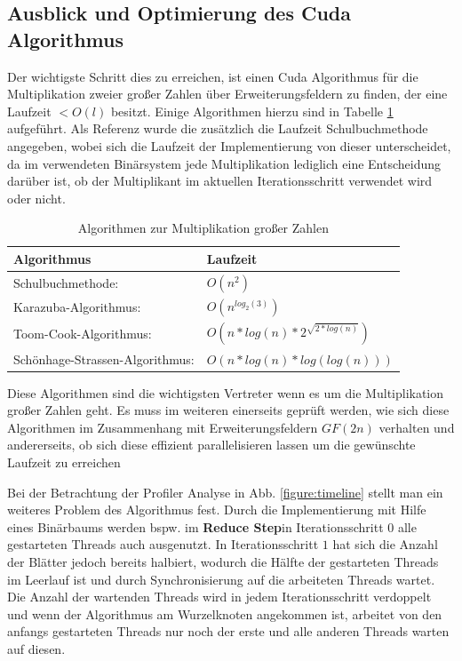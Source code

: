 \subsection{Ausblick und Optimierung des Cuda Algorithmus}
Der wichtigste Schritt dies zu erreichen, ist einen Cuda Algorithmus für die Multiplikation zweier großer Zahlen über Erweiterungsfeldern zu finden, der eine Laufzeit $<O(l)$ besitzt. Einige Algorithmen hierzu sind in Tabelle \ref{table:bnmult} aufgeführt. Als Referenz wurde die zusätzlich die Laufzeit Schulbuchmethode angegeben, wobei sich die Laufzeit der Implementierung von dieser unterscheidet, da im verwendeten Binärsystem jede Multiplikation lediglich eine Entscheidung darüber ist, ob der Multiplikant im aktuellen Iterationsschritt verwendet wird oder nicht.

\begin{table}
\centering
\begin{tabular}{ll}
\hline \hline
Algorithmus & Laufzeit \\
\hline
Schulbuchmethode: & $O(n^2)$ \\
Karazuba-Algorithmus: & $O(n^{log_2(3)})$ \\
Toom-Cook-Algorithmus: & $O(n*log(n)*2^{\sqrt{2*log(n)}})$ \\
Schönhage-Strassen-Algorithmus: & $O(n*log(n)*log(log(n)))$ \\
\end{tabular}
\caption{Algorithmen zur Multiplikation großer Zahlen}
\label{table:bnmult}
\end{table}

Diese Algorithmen sind die wichtigsten Vertreter wenn es um die Multiplikation großer Zahlen geht. Es muss im weiteren einerseits geprüft werden, wie sich diese Algorithmen im Zusammenhang mit Erweiterungsfeldern $GF(2n)$ verhalten und andererseits, ob sich diese effizient parallelisieren lassen um die gewünschte Laufzeit zu erreichen\newline

Bei der Betrachtung der Profiler Analyse in Abb. \ref{figure:timeline} stellt man ein weiteres Problem des Algorithmus fest. Durch die Implementierung mit Hilfe eines Binärbaums werden bspw. im \textbf{Reduce Step}in Iterationsschritt $0$ alle gestarteten Threads auch ausgenutzt. In Iterationsschritt $1$ hat sich die Anzahl der Blätter jedoch bereits halbiert, wodurch die Hälfte der gestarteten Threads im Leerlauf ist und durch Synchronisierung auf die arbeiteten Threads wartet. Die Anzahl der wartenden Threads wird in jedem Iterationsschritt verdoppelt und wenn der Algorithmus am Wurzelknoten angekommen ist, arbeitet von den anfangs gestarteten Threads nur noch der erste und alle anderen Threads warten auf diesen.

